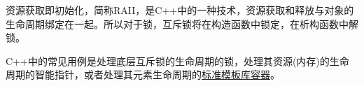 资源获取即初始化，简称RAII，是C++中的一种技术，资源获取和释放与对象的生命周期绑定在一起。所以对于锁，互斥锁将在构造函数中锁定，在析构函数中解锁。

C++中的常见用例是处理底层互斥锁的生命周期的锁，处理其资源(内存)的生命周期的智能指针，或者处理其元素生命周期的\href{https://en.cppreference.com/w/cpp/container}{标准模板库容器}。